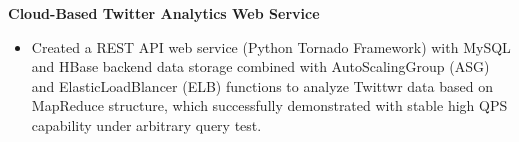 \begin{flushleft}
{\raggedright\normalsize \textbf{Cloud-Based Twitter Analytics Web Service}} %

\begin{itemize}[leftmargin=*, topsep=1pt, partopsep=1.5pt]
\setlength\itemsep{1pt}
\item Created a REST API web service (Python Tornado Framework) with MySQL and HBase backend data storage combined with AutoScalingGroup (ASG) and ElasticLoadBlancer (ELB) functions to analyze Twittwr data based on MapReduce structure, which successfully demonstrated with stable high QPS capability under arbitrary query test.
\end{itemize}
\end{flushleft}

